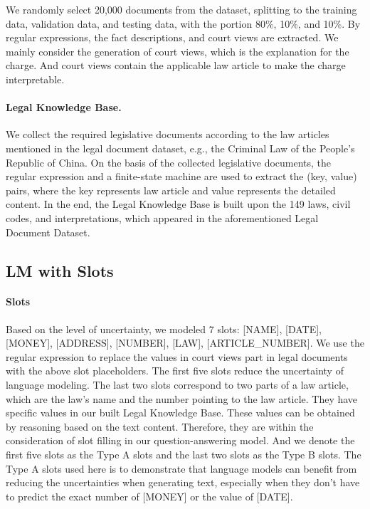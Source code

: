 \documentclass{article}
\begin{document}
We randomly select 20,000 documents from the dataset, splitting to the training data, validation data, and testing data, with the portion 80\%, 10\%, and 10\%. 
By regular expressions, the fact descriptions, and court views are extracted. 
We mainly consider the generation of court views, which is the explanation for the charge. 
And court views contain the applicable law article to make the charge interpretable. 

\paragraph{Legal Knowledge Base.} 
We collect the required legislative documents according to the law articles mentioned in the legal document dataset, e.g., the Criminal Law of the People's Republic of China. 
On the basis of the collected legislative documents, the regular expression and a finite-state machine are used to extract the (key, value) pairs, where the key represents law article and value represents the detailed content. 
In the end, the Legal Knowledge Base is built upon the 149 laws, civil codes, and interpretations, which appeared in the aforementioned Legal Document Dataset. 

\subsection{LM with Slots}
\paragraph{Slots}
Based on the level of uncertainty, we modeled 7 slots: [NAME], [DATE], [MONEY], [ADDRESS], [NUMBER], [LAW], [ARTICLE\_NUMBER].
We use the regular expression to replace the values in court views part in legal documents with the above slot placeholders.
The first five slots reduce the uncertainty of language modeling. 
The last two slots correspond to two parts of a law article, which are the law's name and the number pointing to the law article. 
They have specific values in our built Legal Knowledge Base. 
These values can be obtained by reasoning based on the text content. 
Therefore, they are within the consideration of slot filling in our question-answering model.
And we denote the first five slots as the Type A slots and the last two slots as the Type B slots. 
The Type A slots used here is to demonstrate that language models can benefit from reducing the uncertainties when generating text, especially when they don't have to predict the exact number of [MONEY] or the value of [DATE].  
\end{document}
